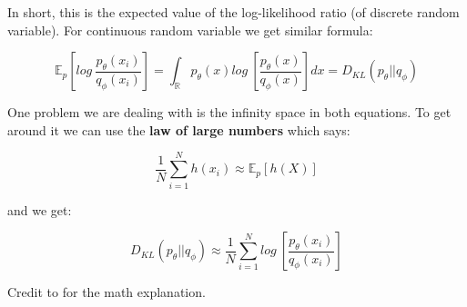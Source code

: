 In short, this is the expected value of the log-likelihood ratio (of discrete random variable). For continuous random variable we get similar formula:

\begin{equation}
\label{eq:kl_divergence_continous}
    \mathbb{E}_p [log\ \frac{p_\theta(x_i)}{q_\phi(x_i)}]
    =
    \int_{\mathbb{R}} p_\theta(x) log\ [\frac{p_\theta(x)}{q_\phi(x)}] dx
    =
    D_{KL} (p_\theta || q_\phi)
\end{equation}

One problem we are dealing with is the infinity space in both equations.  To get around it we can use the \textbf{law of large numbers} which says:

\begin{equation*}
    \frac{1}{N} \sum_{i=1}^N h(x_i) \approx \mathbb{E}_p [h(X)]
\end{equation*}

and we get:

\begin{equation}
    D_{KL} (p_\theta || q_\phi) \approx
    \frac{1}{N} \sum_{i=1}^N log\ [\frac{p_\theta(x_i)}{q_\phi(x_i)}]
\end{equation}

Credit to \cite{dk-divergence-math-explanation} for the math explanation.